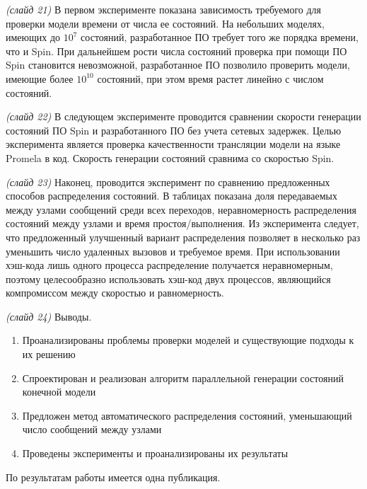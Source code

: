 \documentclass[a4paper,12pt,notitlepage]{article}
\begin{document}
\emph{(слайд 21)} В первом эксперименте показана зависимость требуемого для проверки
модели времени от числа ее состояний. На небольших моделях, имеющих до $10^7$ состояний,
разработанное ПО требует того же порядка времени, что и Spin. При дальнейшем рости числа
состояний проверка при помощи ПО Spin становится невозможной, разработанное ПО позволило
проверить модели, имеющие более $10^{10}$ состояний, при этом время растет линейно с
числом состояний.

\emph{(слайд 22)} В следующем эксперименте проводится сравнении скорости генерации
состояний ПО Spin и разработанного ПО без учета сетевых задержек. Целью эксперимента
является проверка качественности трансляции модели на языке Promela в код. Скорость
генерации состояний сравнима со скоростью Spin.

\emph{(слайд 23)} Наконец, проводится эксперимент по сравнению предложенных способов
распределения состояний. В таблицах показана доля передаваемых между узлами сообщений
среди всех переходов, неравномерность распределения состояний между узлами и время
простоя/выполнения. Из эксперимента следует, что предложенный улучшенный вариант
распределения позволяет в несколько раз уменьшить число удаленных вызовов и требуемое
время. При использовании хэш-кода лишь одного процесса распределение получается
неравномерным, поэтому целесообразно использовать хэш-код двух процессов, являющийся
компромиссом между скоростью и равномерность.

\emph{(слайд 24)} Выводы. 
\begin{enumerate}
\item Проанализированы проблемы проверки моделей и существующие подходы к их решению
\item Спроектирован и реализован алгоритм параллельной генерации состояний конечной
  модели
\item Предложен метод автоматического распределения состояний, уменьшающий число сообщений
  между узлами
\item Проведены эксперименты и проанализированы их результаты
\end{enumerate}

По результатам работы имеется одна публикация.
\end{document}
